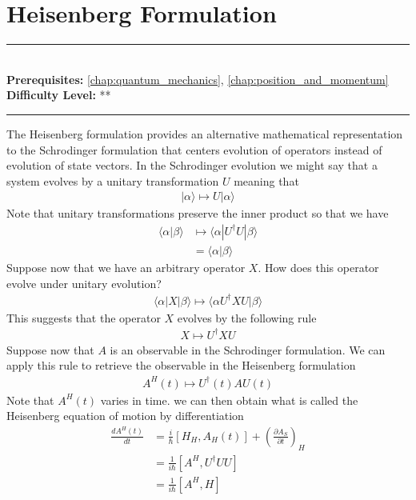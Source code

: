 \documentclass[book.tex]{subfiles}
\begin{document}
\chapter{Heisenberg Formulation}

\label{chap:schrodinger}
\noindent\rule{11cm}{0.4pt} \\
\textbf{Prerequisites:} \autoref{chap:quantum_mechanics}, \autoref{chap:position_and_momentum} \\
\textbf{Difficulty Level:} ** \\
\noindent\rule{11cm}{0.4pt}
\vspace{5mm}

The Heisenberg formulation provides an alternative mathematical representation to the Schrodinger formulation that centers evolution of operators instead of evolution of state vectors. In the Schrodinger evolution we might say that a system evolves by a unitary transformation $U$ meaning that
\begin{align}
    |\alpha\rangle \mapsto U|\alpha \rangle
\end{align}
Note that unitary transformations preserve the inner product so that we have
\begin{align}
\langle \alpha | \beta \rangle &\mapsto \langle \alpha | U^\dagger U | \beta \rangle \\
&= \langle \alpha | \beta \rangle
\end{align}
Suppose now that we have an arbitrary operator $X$. How does this operator evolve under unitary evolution?
\begin{align}
    \langle \alpha | X | \beta \rangle \mapsto \langle \alpha U^\dagger X U | \beta \rangle 
\end{align}
This suggests that the operator $X$ evolves by the following rule
\begin{align}
    X \mapsto U^\dagger X U
\end{align}
Suppose now that $A$ is an observable in the Schrodinger formulation. We can apply this rule to retrieve the observable in the Heisenberg formulation
\begin{align}
    A^H(t) \mapsto U^\dagger(t) A U(t)
\end{align}
Note that $A^H(t)$ varies in time. we can then obtain what is called the Heisenberg equation of motion by differentiation
\begin{align}
    \frac{dA^H(t)}{dt} &= \frac{i}{\hbar} [H_H, A_H(t)] + \left (\frac{\partial A_S}{\partial t} \right )_H \\
    &= \frac{1}{i\hbar}[A^H, U^\dagger U U] \\
    &= \frac{1}{i\hbar}[A^H, H]
\end{align}
\end{document}
